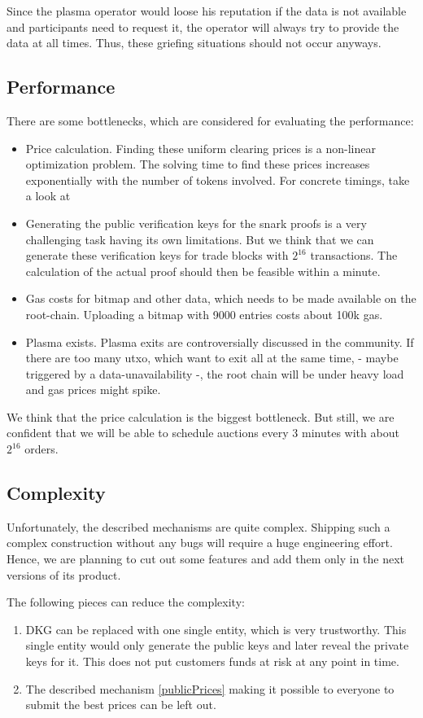 \documentclass[11pt,parskip=full]{scrartcl}%
\begin{document}
Since the plasma operator would loose his reputation if the data is not available and participants need to request it, the operator will always try to provide the data at all times. Thus, these griefing situations should not occur anyways.

\subsection{Performance}
There are some bottlenecks, which are considered for evaluating the performance:
\begin{itemize}
\item Price calculation. 
Finding these uniform clearing prices is a non-linear optimization problem. 
The solving time to find these prices increases exponentially with the number of tokens involved. For concrete timings, take a look at \cite{priceOptimization}
\item Generating the public verification keys for the snark proofs is a very challenging task having its own limitations. 
But we think that we can generate these verification keys for trade blocks with $2^{16}$ transactions. 
The calculation of the actual proof should then be feasible within a minute. 
\item Gas costs for bitmap and other data, which needs to be made available on the root-chain. 
Uploading a bitmap with 9000 entries costs about 100k gas. 
\item Plasma exists.
Plasma exits are controversially discussed in the community. 
If there are too many utxo, which want to exit all at the same time, - maybe triggered by a data-unavailability -, the root chain will be under heavy load and gas prices might spike. 
\end{itemize}
We think that the price calculation is the biggest bottleneck. 
But still, we are confident that we will be able to schedule auctions every 3 minutes with about $2^{16}$ orders. 
\subsection{Complexity}
Unfortunately, the described mechanisms are quite complex. 
Shipping such a complex construction without any bugs will require a huge engineering effort. 
Hence, we are planning to cut out some features and add them only in the next versions of its product. 

The following pieces can reduce the complexity:
\begin{enumerate}
\item
DKG can be replaced with one single entity, which is very trustworthy. 
This single entity would only generate the public keys and later reveal the private keys for it. 
This does not put customers funds at risk at any point in time. 
\item
The described mechanism \ref{publicPrices} making it possible to everyone to submit the best prices can be left out. 
\end{enumerate}
\end{document}
